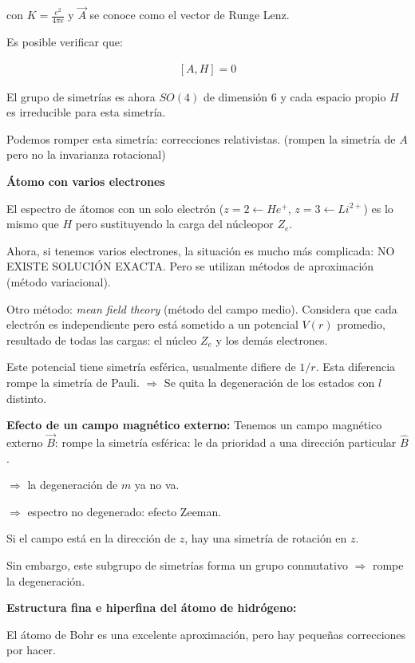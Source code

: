 con $K=\frac{e^2}{4\pi\epsilon}$ y $\vec{A}$ se conoce como el vector de Runge Lenz.

Es posible verificar que:

\begin{align*}
    \left[A,H\right]=0
\end{align*}

El grupo de simetrías es ahora $SO(4)$ de dimensión $6$ y cada espacio propio $H$ es irreducible para esta simetría.

Podemos romper esta simetría: correcciones relativistas. (rompen la simetría de $A$ pero no la invarianza rotacional)

\bigskip

\textbf{Átomo con varios electrones}

El espectro de átomos con un solo electrón ($z=2\leftarrow He^+$, $z=3\leftarrow Li^{2+}$) es lo mismo que $H$ pero sustituyendo la carga del núcleopor $Z_e$.

Ahora, si tenemos varios electrones, la situación es mucho más complicada: NO EXISTE SOLUCIÓN EXACTA. Pero se utilizan métodos de aproximación (método variacional).

Otro método: \textit{mean field theory} (método del campo medio). Considera que cada electrón es independiente pero está sometido a un potencial $V(r)$ promedio, resultado de todas las cargas: el núcleo $Z_e$ y los demás electrones.

Este potencial tiene simetría esférica, usualmente difiere de $1/r$. Esta diferencia rompe la simetría de Pauli. $\Rightarrow$ Se quita la degeneración de los estados con $l$ distinto.

\bigskip

\textbf{Efecto de un campo magnético externo:}
Tenemos un campo magnético externo $\vec{B}$: rompe la simetría esférica: le da prioridad a una dirección particular $\hat{B}$.

$\Rightarrow $ la degeneración de $m$ ya no va.

$\Rightarrow$ espectro no degenerado: efecto Zeeman.

Si el campo está en la dirección de $z$, hay una simetría de rotación en $z$.

Sin embargo, este subgrupo de simetrías forma un grupo conmutativo $\Rightarrow$ rompe la degeneración.

\bigskip

\textbf{Estructura fina e hiperfina del átomo de hidrógeno:}

El átomo de Bohr es una excelente aproximación, pero hay pequeñas correcciones por hacer.

